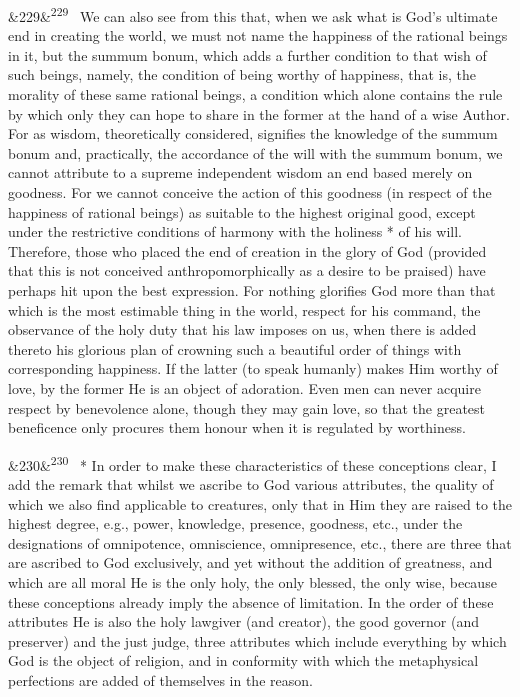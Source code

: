 \documentclass[12pt]{article}
\newcommand{\para}[1][]{\par\noindent\ifx&#1&\else\textsuperscript{\footnotesize #1}~\fi}
\begin{document}
\para[229] We can also see from this that, when we ask what is God's ultimate end in creating the world, we must not name the happiness of the rational beings in it, but the summum bonum, which adds a further condition to that wish of such beings, namely, the condition of being worthy of happiness, that is, the morality of these same rational beings, a condition which alone contains the rule by which only they can hope to share in the former at the hand of a wise Author. For as wisdom, theoretically considered, signifies the knowledge of the summum bonum and, practically, the accordance of the will with the summum bonum, we cannot attribute to a supreme independent wisdom an end based merely on goodness. For we cannot conceive the action of this goodness (in respect of the happiness of rational beings) as suitable to the highest original good, except under the restrictive conditions of harmony with the holiness * of his will. Therefore, those who placed the end of creation in the glory of God (provided that this is not conceived anthropomorphically as a desire to be praised) have perhaps hit upon the best expression. For nothing glorifies God more than that which is the most estimable thing in the world, respect for his command, the observance of the holy duty that his law imposes on us, when there is added thereto his glorious plan of crowning such a beautiful order of things with corresponding happiness. If the latter (to speak humanly) makes Him worthy of love, by the former He is an object of adoration. Even men can never acquire respect by benevolence alone, though they may gain love, so that the greatest beneficence only procures them honour when it is regulated by worthiness.

\para[230] * In order to make these characteristics of these conceptions clear, I add the remark that whilst we ascribe to God various attributes, the quality of which we also find applicable to creatures, only that in Him they are raised to the highest degree, e.g., power, knowledge, presence, goodness, etc., under the designations of omnipotence, omniscience, omnipresence, etc., there are three that are ascribed to God exclusively, and yet without the addition of greatness, and which are all moral He is the only holy, the only blessed, the only wise, because these conceptions already imply the absence of limitation. In the order of these attributes He is also the holy lawgiver (and creator), the good governor (and preserver) and the just judge, three attributes which include everything by which God is the object of religion, and in conformity with which the metaphysical perfections are added of themselves in the reason.
\end{document}
